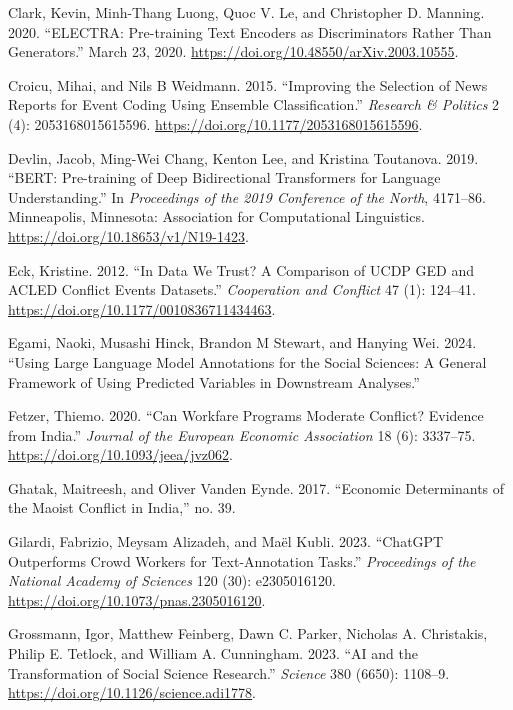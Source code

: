 \documentclass[
  11pt,
]{article}
\newlength{\cslhangindent}
\newenvironment{CSLReferences}[2] %
 {\begin{list}{}{%
  \setlength{\itemindent}{0pt}
  \setlength{\leftmargin}{0pt}
  \setlength{\parsep}{0pt}
  \ifodd #1
   \setlength{\leftmargin}{\cslhangindent}
   \setlength{\itemindent}{-1\cslhangindent}
  \fi
  \setlength{\itemsep}{#2\baselineskip}}}
 {\end{list}}
\begin{document}
\begin{CSLReferences}{1}{0}
Clark, Kevin, Minh-Thang Luong, Quoc V. Le, and Christopher D. Manning.
2020. {``{ELECTRA}: {Pre-training Text Encoders} as {Discriminators
Rather Than Generators}.''} March 23, 2020.
\url{https://doi.org/10.48550/arXiv.2003.10555}.

Croicu, Mihai, and Nils B Weidmann. 2015. {``Improving the Selection of
News Reports for Event Coding Using Ensemble Classification.''}
\emph{Research \& Politics} 2 (4): 2053168015615596.
\url{https://doi.org/10.1177/2053168015615596}.

Devlin, Jacob, Ming-Wei Chang, Kenton Lee, and Kristina Toutanova. 2019.
{``{BERT}: {Pre-training} of {Deep Bidirectional Transformers} for
{Language Understanding}.''} In \emph{Proceedings of the 2019
{Conference} of the {North}}, 4171--86. Minneapolis, Minnesota:
Association for Computational Linguistics.
\url{https://doi.org/10.18653/v1/N19-1423}.

Eck, Kristine. 2012. {``In Data We Trust? {A} Comparison of {UCDP GED}
and {ACLED} Conflict Events Datasets.''} \emph{Cooperation and Conflict}
47 (1): 124--41. \url{https://doi.org/10.1177/0010836711434463}.

Egami, Naoki, Musashi Hinck, Brandon M Stewart, and Hanying Wei. 2024.
{``Using {Large Language Model Annotations} for the {Social Sciences}:
{A General Framework} of {Using Predicted Variables} in {Downstream
Analyses}.''}

Fetzer, Thiemo. 2020. {``Can {Workfare Programs Moderate Conflict}?
{Evidence} from {India}.''} \emph{Journal of the European Economic
Association} 18 (6): 3337--75.
\url{https://doi.org/10.1093/jeea/jvz062}.

Ghatak, Maitreesh, and Oliver Vanden Eynde. 2017. {``Economic
{Determinants} of the {Maoist Conﬂict} in {India},''} no. 39.

Gilardi, Fabrizio, Meysam Alizadeh, and Maël Kubli. 2023. {``{ChatGPT}
Outperforms Crowd Workers for Text-Annotation Tasks.''}
\emph{Proceedings of the National Academy of Sciences} 120 (30):
e2305016120. \url{https://doi.org/10.1073/pnas.2305016120}.

Grossmann, Igor, Matthew Feinberg, Dawn C. Parker, Nicholas A.
Christakis, Philip E. Tetlock, and William A. Cunningham. 2023. {``{AI}
and the Transformation of Social Science Research.''} \emph{Science} 380
(6650): 1108--9. \url{https://doi.org/10.1126/science.adi1778}.


\end{CSLReferences}
\end{document}
